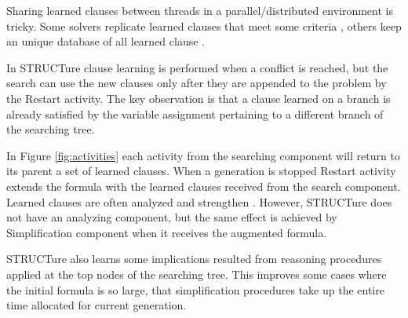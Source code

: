 Sharing learned clauses between threads in a parallel/distributed
environment is tricky.  Some solvers replicate learned clauses that
meet some criteria \cite{Hamadi09manysat:a}, others keep an unique
database of all learned clause \cite{mine:miraxt}.

In STRUCTure clause learning is performed when a conflict is reached,
but the search can use the new clauses only after they are appended
to the problem by the Restart activity.  The key observation is that
a clause learned on a branch is already satisfied by the variable
assignment pertaining to a different branch of the searching tree.

In Figure \ref{fig:activities} each activity from the
searching component will return to its parent a set of learned
clauses. When a generation is stopped Restart activity extends
the formula with the learned clauses received from the search
component.  Learned clauses are often analyzed and strengthen
\cite{Audemard_ageneralized}. However, STRUCTure does not have
an analyzing component, but the same effect is achieved by
Simplification component when it receives the augmented formula.

STRUCTure also learns some implications resulted from reasoning
procedures applied at the top nodes of the searching tree. This
improves some cases where the initial formula is so large, that
simplification procedures take up the entire time allocated for
current generation.
